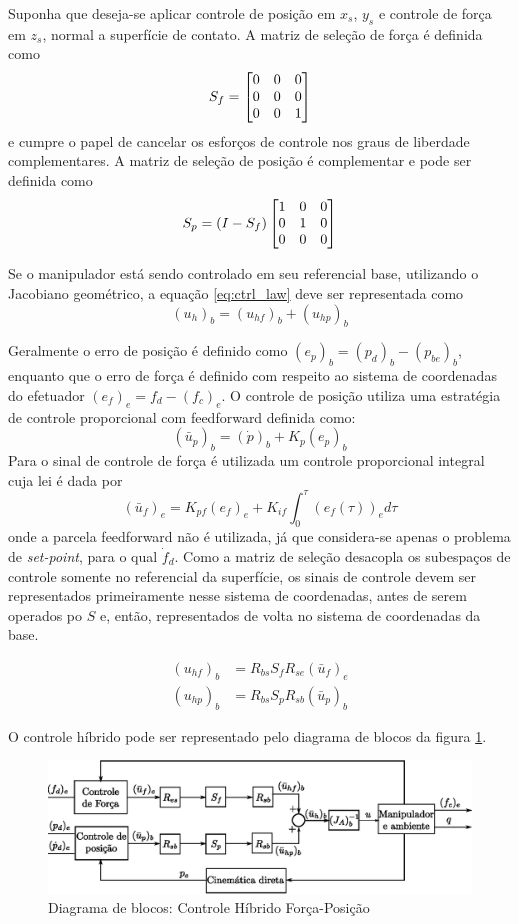 Suponha que deseja-se aplicar controle de posição em $x_s$, $y_s$ e controle de força em $z_s$, normal a superfície de contato. A matriz de seleção de força é definida como
\begin{equation}
S_f = \begin{bmatrix}
    0 & 0 & 0 \\
    0 & 0 & 0 \\
    0 & 0 & 1 
\end{bmatrix}
\end{equation}
e cumpre o papel de cancelar os esforços de controle nos graus de liberdade complementares. A matriz de seleção de posição é complementar e pode ser definida como
\begin{equation}
S_p = (I - S_f) \begin{bmatrix}
    1 & 0 & 0 \\
    0 & 1 & 0 \\
    0 & 0 & 0 
\end{bmatrix}
\end{equation}

Se o manipulador está sendo controlado em seu referencial base, utilizando o Jacobiano geométrico, a equação \eqref{eq:ctrl_law} deve ser representada como 
\begin{equation}
({u}_h)_b = ({u}_{hf})_b + ({u}_{hp})_b
\end{equation}

Geralmente o erro de posição é definido como $(e_p)_b = (p_d)_b - (p_{be})_b$, enquanto que o erro de força é definido com respeito ao sistema de coordenadas do efetuador  $(e_f)_e = f_d - (f_{c})_e$. O controle de posição utiliza uma estratégia de controle proporcional com feedforward definida como:
\begin{equation}
(\bar{u}_p)_b = (\dot{p})_b + K_{p} (e_p)_b
\end{equation}
Para o sinal de controle de força é utilizada um controle proporcional integral cuja lei é dada por 
\begin{equation}
(\bar{u}_f)_e = K_{pf} (e_f)_e + K_{if} \int^{\tau}_0 (e_f(\tau))_e d\tau
\end{equation}
onde a parcela feedforward não é utilizada, já que considera-se apenas o problema de \textit{set-point}, para o qual $\dot{f}_d$. Como a matriz de seleção desacopla os subespaços de controle somente no referencial da superfície, os sinais de controle devem ser representados primeiramente nesse sistema de coordenadas, antes de serem operados po $S$ e, então, representados de volta no sistema de coordenadas da base.

\begin{align}
({u}_{hf})_b &= R_{bs} S_f R_{se} (\bar{u}_f)_e \\
({u}_{hp})_b &= R_{bs} S_p R_{sb} (\bar{u}_p)_b 
\end{align}

O controle híbrido pode ser representado pelo diagrama de blocos da figura \ref{fig:hybrid_block}.

\begin{figure}[H]
  \centering
  \includegraphics[width=\linewidth]{./img/hybrid.eps}
  \caption{Diagrama de blocos: Controle Híbrido Força-Posição}
  \label{fig:hybrid_block}
\end{figure}